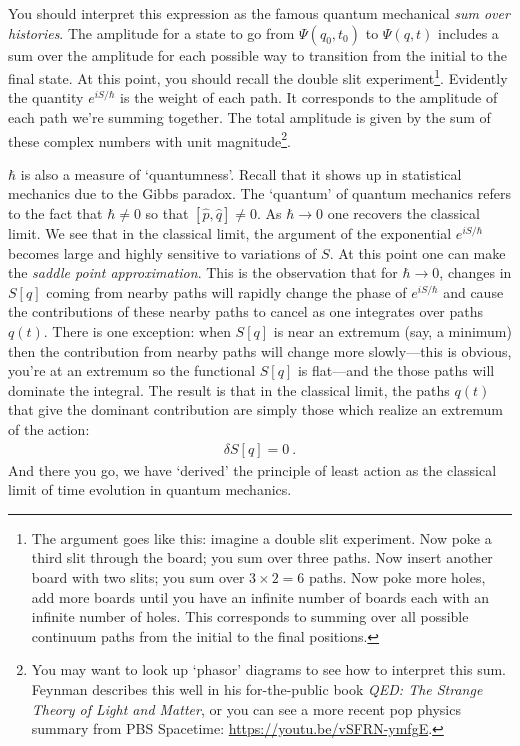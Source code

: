 You should interpret this expression as the famous quantum mechanical \emph{sum over histories}. The amplitude for a state to go from $\Psi(q_0,t_0)$ to $\Psi(q,t)$ includes a sum over the amplitude for each possible way to transition from the initial to the final state. At this point, you should recall the double slit experiment\footnote{The argument goes like this: imagine a double slit experiment. Now poke a third slit through the board; you sum over three paths. Now insert another board with two slits; you sum over $3\times 2 = 6$ paths. Now poke more holes, add more boards until you have an infinite number of boards each with an infinite number of holes. This corresponds to summing over all possible continuum paths from the initial to the final positions.}.
%
Evidently the quantity $e^{iS/\hbar}$ is the weight of each path. It corresponds to the amplitude of each path we're summing together. The total amplitude is given by the sum of these complex numbers with unit magnitude\footnote{You may want to look up `phasor' diagrams to see how to interpret this sum. Feynman describes this well in his for-the-public book \emph{QED: The Strange Theory of Light and Matter}, or you can see a more recent pop physics summary from PBS Spacetime: \url{https://youtu.be/vSFRN-ymfgE}.}.

$\hbar$ is also a measure of `quantumness'. Recall that it shows up in statistical mechanics due to the Gibbs paradox. The `quantum' of quantum mechanics refers to the fact that $\hbar\neq 0$ so that $[\hat p, \hat q] \neq 0$. As $\hbar\to 0$ one recovers the classical limit. We see that in the classical limit, the argument of the exponential $e^{iS/\hbar}$ becomes large and highly sensitive to variations of $S$. At this point one can make the \emph{saddle point approximation}. This is the observation that for $\hbar\to 0$, changes in $S[q]$ coming from nearby paths will rapidly change the phase of $e^{iS/\hbar}$ and cause the contributions of these nearby paths to cancel as one integrates over paths $q(t)$. There is one exception: when $S[q]$ is near an extremum (say, a minimum) then the contribution from nearby paths will change more slowly---this is obvious, you're at an extremum so the functional $S[q]$ is flat---and the those paths will dominate the integral. The result is that in the classical limit, the paths $q(t)$ that give the dominant contribution are simply those which realize an extremum of the action:
\begin{align}
	\delta S[q] = 0 \ .
\end{align}
And there you go, we have `derived' the principle of least action as the classical limit of time evolution in quantum mechanics. 

